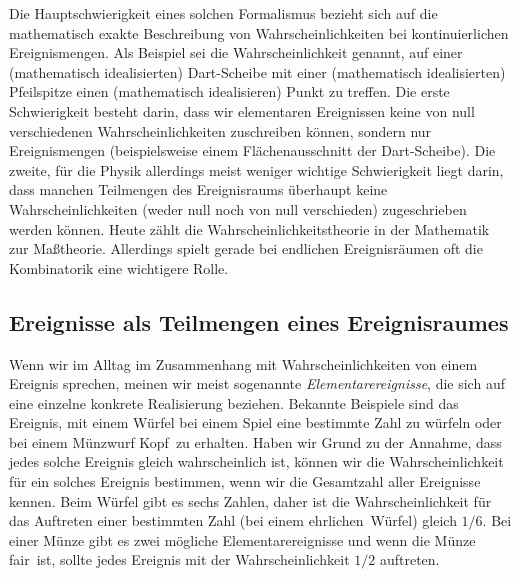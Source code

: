 Die Hauptschwierigkeit eines solchen 
Formalismus bezieht sich auf die mathematisch
exakte Beschreibung von Wahrscheinlichkeiten
bei kontinuierlichen Ereignismengen. Als Beispiel
sei die Wahrscheinlichkeit genannt, auf einer (mathematisch
idealisierten) Dart-Scheibe mit einer (mathematisch
idealisierten) Pfeilspitze einen (mathematisch
idealisieren) Punkt zu treffen. Die erste Schwierigkeit
besteht darin, dass wir elementaren Ereignissen
keine von null verschiedenen 
Wahrscheinlichkeiten zuschreiben 
k\"onnen, sondern nur Ereignismengen (beispielsweise
einem Fl\"achenausschnitt der Dart-Scheibe). 
Die zweite,
f\"ur die Physik allerdings meist weniger wichtige
Schwierigkeit liegt darin, dass manchen
Teilmengen des Ereignisraums \"uberhaupt keine 
Wahrscheinlichkeiten (weder null noch von null
verschieden)
zugeschrieben werden k\"onnen. Heute z\"ahlt
die Wahrscheinlichkeitstheorie in der Mathematik
zur Ma\ss theorie. Allerdings spielt gerade bei
endlichen Ereignisr\"aumen oft die Kombinatorik
eine wichtigere Rolle. 

\subsection{Ereignisse als Teilmengen eines
Ereignisraumes}

Wenn wir im Alltag im Zusammenhang mit 
Wahrscheinlichkeiten von einem Ereignis sprechen,
meinen wir meist sogenannte {\em Elementarereignisse},
die sich auf eine einzelne konkrete Realisierung beziehen.
Bekannte Beispiele sind das Ereignis, mit einem
W\"urfel bei einem Spiel eine bestimmte Zahl zu
w\"urfeln oder bei einem M\"unzwurf \glqq Kopf\grqq\ zu
erhalten. Haben wir Grund zu der Annahme, dass 
jedes solche Ereignis gleich wahrscheinlich ist,
k\"onnen wir die Wahrscheinlichkeit f\"ur ein
solches Ereignis bestimmen, wenn wir die Gesamtzahl
aller Ereignisse kennen. Beim W\"urfel gibt es 
sechs Zahlen, daher ist die Wahrscheinlichkeit
f\"ur das Auftreten einer bestimmten Zahl (bei einem
\glqq ehrlichen\grqq\ W\"urfel) gleich $1/6$. Bei
einer M\"unze gibt es zwei m\"ogliche Elementarereignisse
und wenn die M\"unze \glqq fair\grqq\ ist, sollte jedes
Ereignis mit der Wahrscheinlichkeit $1/2$ auftreten.

